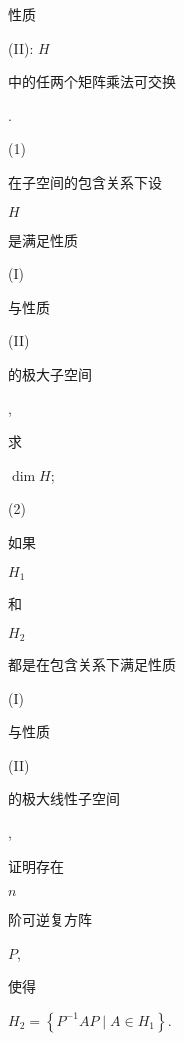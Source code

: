 \documentclass[10pt]{article}
\begin{document}
\begin{CJK}{UTF8}{mj}性质\end{CJK} (II): $H$ \begin{CJK}{UTF8}{mj}中的任两个矩阵乘法可交换\end{CJK}.

(1) \begin{CJK}{UTF8}{mj}在子空间的包含关系下设\end{CJK} $H$ \begin{CJK}{UTF8}{mj}是满足性质\end{CJK} (I) \begin{CJK}{UTF8}{mj}与性质\end{CJK} (II) \begin{CJK}{UTF8}{mj}的极大子空间\end{CJK}, \begin{CJK}{UTF8}{mj}求\end{CJK} $\operatorname{dim} H$;

(2) \begin{CJK}{UTF8}{mj}如果\end{CJK} $H_{1}$ \begin{CJK}{UTF8}{mj}和\end{CJK} $H_{2}$ \begin{CJK}{UTF8}{mj}都是在包含关系下满足性质\end{CJK} (I) \begin{CJK}{UTF8}{mj}与性质\end{CJK} (II) \begin{CJK}{UTF8}{mj}的极大线性子空间\end{CJK}, \begin{CJK}{UTF8}{mj}证明存在\end{CJK} $n$ \begin{CJK}{UTF8}{mj}阶可逆复方阵\end{CJK} $P$, \begin{CJK}{UTF8}{mj}使得\end{CJK} $H_{2}=\left\{P^{-1} A P \mid A \in H_{1}\right\}$.
\end{document}
